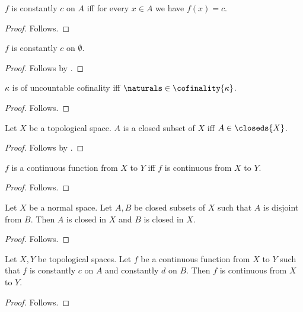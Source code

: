 



\begin{proposition}\label{readability_constant_expansion}
    $f$ is constantly $c$ on $A$ iff for every $x\in A$ we have $f(x)=c$.
\end{proposition}
\begin{proof}
    Follows.
\end{proof}

\begin{proposition}\label{readability_constant_empty}
    $f$ is constantly $c$ on $\emptyset$.
\end{proposition}
\begin{proof}
    Follows by .
\end{proof}

\begin{proposition}\label{readability_cofinality_expansion}
    $\kappa$ is of uncountable cofinality iff $\naturals\in\cofinality{\kappa}$.
\end{proposition}
\begin{proof}
    Follows.
\end{proof}

\begin{proposition}\label{readability_closed_expansion}
    Let $X$ be a topological space.
    $A$ is a closed subset of $X$ iff $A\in\closeds{X}$.
\end{proposition}
\begin{proof}
    Follows by .
\end{proof}

\begin{proposition}\label{readability_continuous_expansion}
    $f$ is a continuous function from $X$ to $Y$ iff
        $f$ is continuous from $X$ to $Y$.
\end{proposition}
\begin{proof}
    Follows.
\end{proof}

\begin{proposition}\label{readability_closed_head}
    Let $X$ be a normal space.
    Let $A,B$ be closed subsets of $X$ such that $A$ is disjoint from $B$.
    Then $A$ is closed in $X$ and $B$ is closed in $X$.
\end{proposition}
\begin{proof}
    Follows.
\end{proof}

\begin{proposition}\label{readability_continuous_noun}
    Let $X,Y$ be topological spaces.
    Let $f$ be a continuous function from $X$ to $Y$ such that
        $f$ is constantly $c$ on $A$ and constantly $d$ on $B$.
    Then $f$ is continuous from $X$ to $Y$.
\end{proposition}
\begin{proof}
    Follows.
\end{proof}
